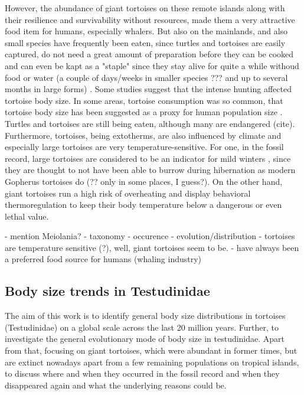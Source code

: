 However, the abundance of giant tortoises on these remote islands along with their resilience and survivability without resources, made them a very attractive food item for humans, especially whalers.
But also on the mainlands, and also small species have frequently been eaten, since turtles and tortoises are easily captured, do not need a great amount of preparation before they can be cooked and can even be kapt as a "staple" since they stay alive for quite a while withoud food or water (a couple of days/weeks in smaller species ??? and up to several months in large forms) \citep{Thompson2002,Thompson2014}. Some studies suggest that the intense hunting affected tortoise body size. In some areas, tortoise consumption was so common, that tortoise body size has been suggested as a proxy for human population size \citep{Steele2005,Stiner1999,Stiner2000}. Turtles and tortoises are still being eaten, although many are endangered (cite).
Furthermore, tortoises, being extotherms, are also influenced by climate and especially large tortoises are very temperature-sensitive. For one, in the fossil record, large tortoises are considered to be an indicator for mild winters \citep{Hibbard1960}, since they are thought to not have been able to burrow during hibernation as modern Gopherus tortoises do (?? only in some places, I guess?). On the other hand, giant tortoises run a high risk of overheating and display behavioral thermoregulation to keep their body temperature below a dangerous or even lethal value. \citep{Sturbaum1982, Schleich1981} 


 
- mention Meiolania?
- taxonomy
- occurence
- evolution/distribution
- tortoises are temperature sensitive (?), well, giant tortoises seem to be.
- have always been a preferred food source for humans (whaling industry)

\subsection{Body size trends in Testudinidae}

The aim of this work is to identify general body size distributions in tortoises (Testudinidae) on a global scale across the last 20 million years. Further, to investigate the general evolutionary mode of body size in testudinidae. Apart from that, focusing on giant tortoises, which were abundant in former times, but are extinct nowadays apart from a few remaining populations on tropical islands, to discuss where and when they occurred in the fossil record and when they disappeared again and what the underlying reasons could be.

